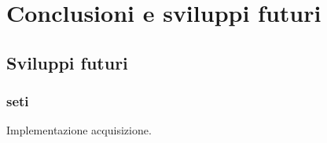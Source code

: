 \chapter{Conclusioni e sviluppi futuri}
\label{conclusions}
\section{Sviluppi futuri}
\subsection{\ac{seti}}
\label{seti}
Implementazione acquisizione.
